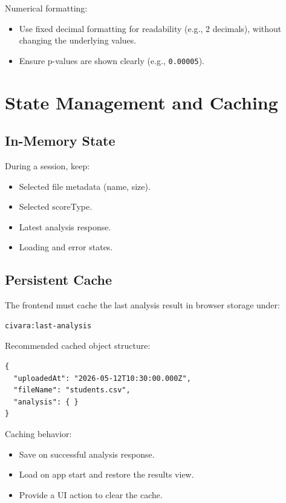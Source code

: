 \documentclass[12pt,a4paper]{article}
\begin{document}
Numerical formatting:
\begin{itemize}
    \item Use fixed decimal formatting for readability (e.g., 2 decimals), without changing the underlying values.
    \item Ensure p-values are shown clearly (e.g., \texttt{0.00005}).
\end{itemize}

\section{State Management and Caching}

\subsection{In-Memory State}

During a session, keep:
\begin{itemize}
    \item Selected file metadata (name, size).
    \item Selected scoreType.
    \item Latest analysis response.
    \item Loading and error states.
\end{itemize}

\subsection{Persistent Cache}

The frontend must cache the last analysis result in browser storage under:
\begin{lstlisting}
civara:last-analysis
\end{lstlisting}

Recommended cached object structure:
\begin{lstlisting}
{
  "uploadedAt": "2026-05-12T10:30:00.000Z",
  "fileName": "students.csv",
  "analysis": { }
}
\end{lstlisting}

Caching behavior:
\begin{itemize}
    \item Save on successful analysis response.
    \item Load on app start and restore the results view.
    \item Provide a UI action to clear the cache.
\end{itemize}
\end{document}
